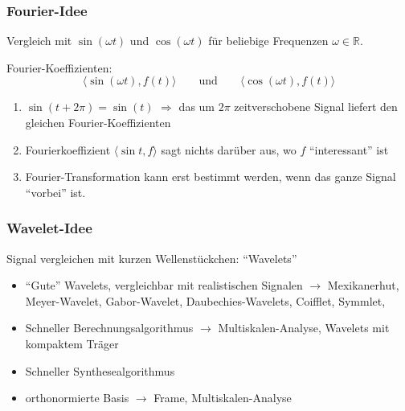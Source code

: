 %
%
\begin{frame}
\frametitle{Fourier-Idee}
\begin{idee}
Vergleich mit $\sin(\omega t)$ und $\cos(\omega t)$ für beliebige Frequenzen
$\omega\in\mathbb R$.
\end{idee}
\bigskip

Fourier-Koeffizienten:
\[
\langle \sin(\omega t), f(t) \rangle
\qquad\text{und}\qquad
\langle \cos(\omega t), f(t) \rangle
\]

\bigskip

\begin{nachteile}
\begin{enumerate}
\item
$\sin(t + 2\pi) = \sin(t)$
$\Rightarrow$ 
das um $2\pi$ zeitverschobene Signal liefert den gleichen
Fourier-Koeffizienten
\item
Fourierkoeffizient $\langle \sin t, f\rangle$ sagt nichts darüber aus, wo
$f$ ``interessant'' ist
\item
Fourier-Transformation kann erst bestimmt werden, wenn das ganze Signal
``vorbei'' ist.
\end{enumerate}
\end{nachteile}
\end{frame}

%
%
\begin{frame}
\frametitle{Wavelet-Idee}
\begin{idee}
Signal vergleichen mit kurzen Wellenstückchen: ``Wavelets''
\end{idee}
\begin{faktoren}
\begin{itemize}
\item 
``Gute'' Wavelets, vergleichbar mit realistischen Signalen
$\rightarrow$
Mexikanerhut, Meyer-Wavelet, Gabor-Wavelet, Daubechies-Wavelets, Coifflet,
Symmlet, 
\item 
Schneller Berechnungsalgorithmus
$\rightarrow$
Multiskalen-Analyse,
Wavelets mit kompaktem Träger
\item 
Schneller Synthesealgorithmus
\item 
orthonormierte Basis
$\rightarrow$ Frame, Multiskalen-Analyse
\end{itemize}
\end{faktoren}
\end{frame}

%
%
\def\stueck#1{
\begin{frame}
\frametitle{Stückweise konstante Funktionen}
\centering
\texttt{[image: \#1]}
\end{frame}
}

